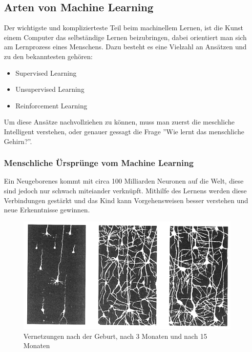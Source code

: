 \subsection{Arten von Machine Learning}

Der wichtigste und komplizierteste Teil beim machinellem Lernen, ist die Kunst einem Computer das selbständige Lernen beizubringen, dabei orientiert man sich am Lernprozess eines Menschens. Dazu besteht es eine Vielzahl an Ansätzen und zu den bekanntesten gehören:

\begin{itemize}
    \item Supervised Learning
    \item Unsupervised Learning
    \item Reinforcement Learning
\end{itemize}

Um diese Ansätze nachvollziehen zu können, muss man zuerst die meschliche Intelligent verstehen, oder genauer gessagt die Frage ''Wie lernt das menschliche Gehirn?''. 

\subsubsection{Menschliche Ürsprünge vom Machine Learning}

Ein Neugeborenes kommt mit circa 100 Milliarden Neuronen auf die Welt, diese sind jedoch nur schwach miteiander verknüpft. Mithilfe des Lernens werden diese Verbindungen gestärkt und das Kind kann Vorgehensweisen besser 
verstehen und neue Erkenntnisse gewinnen.

\begin{figure}[ht]
    \centering
    \includegraphics[scale=0.8]{sections/machine-learning/images/neuronale-netze.png}
    \caption{Vernetzungen nach der Geburt, nach 3 Monaten und nach 15 Monaten}
\end{figure}

